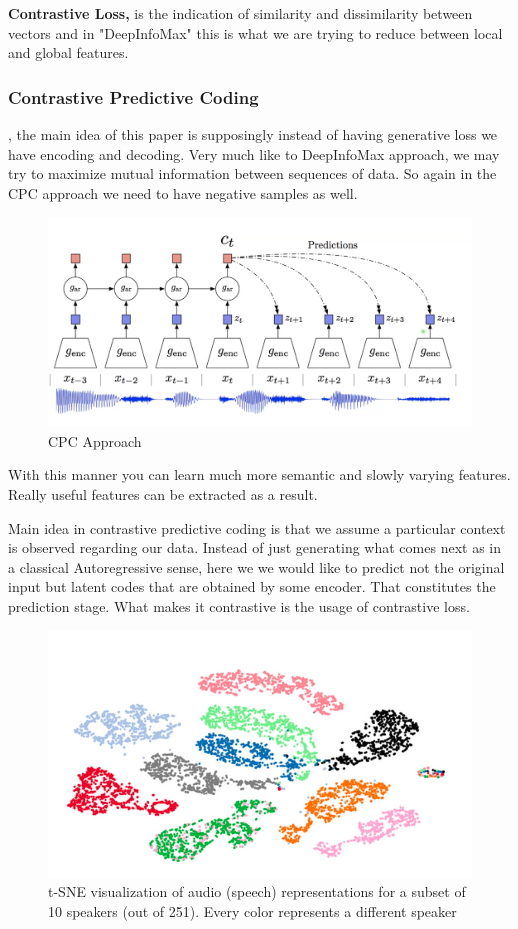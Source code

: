 \documentclass{article}
\begin{document}
 
\textbf{Contrastive Loss,} is the indication of similarity and dissimilarity between
vectors and in "DeepInfoMax" this is what we are trying to reduce between local
and global features.
 
\subsubsection{Contrastive Predictive Coding}
\cite{DBLP:journals/corr/abs-1807-03748}, the main idea of this paper is
supposingly instead of having generative loss we have encoding and decoding.
Very much like to DeepInfoMax approach, we may try to maximize mutual information
between sequences of data. So again in the CPC approach we need to have negative samples as well.
 
\begin{figure}[H]
   \centering
   \includegraphics[width=0.8\linewidth]{figures/cpc.png}
   \caption{CPC Approach}
   \label{fig:cpc}
\end{figure}
 
With this manner you can learn much more semantic and slowly varying features.
Really useful features can be extracted as a result.
 
Main idea in contrastive predictive coding is that we assume a particular
context is observed regarding our data.
Instead of just generating what comes next as in a classical Autoregressive
sense, here we we would like to predict not the original input but
latent codes that are obtained by some encoder. That constitutes the prediction stage.
What makes it contrastive is the usage of contrastive loss.
 
\begin{figure}[H]
   \centering
   \includegraphics[width=0.8\linewidth]{figures/tsne_cpc_speech.png}
   \caption{t-SNE visualization of audio (speech) representations for
   a subset of 10 speakers (out of 251). Every color represents a different speaker}
   \label{fig:cpc_speech}
\end{figure}
 
\end{document}
